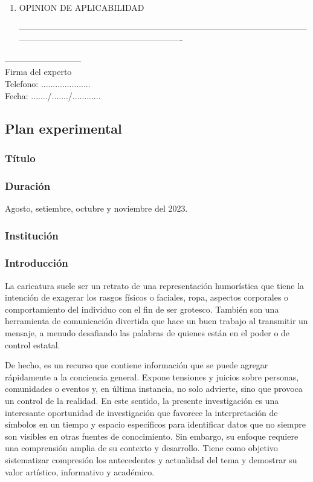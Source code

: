 \documentclass[12pt,a4paper]{article}
\begin{document}
\begin{enumerate}
	\item OPINION DE APLICABILIDAD

	      ----------------------------------------------------------------------------------------------------------------------------------------------------------------
\end{enumerate}

\begin{center}

	---------------------------\\
	Firma del experto\\
	Telefono: .....................\\
	Fecha: ......./......./............
\end{center}


\subsection{Plan experimental}
\subsubsection{Título} \titulo
\subsubsection{Duración} Agosto, setiembre, octubre y noviembre del 2023.
\subsubsection{Institución} \lugar
\subsubsection{Introducción}

La caricatura suele ser un retrato de una representación humorística que tiene la intención de exagerar los rasgos físicos o faciales, ropa, aspectos corporales o comportamiento del individuo con el fin de ser grotesco.  También son una herramienta de comunicación divertida que hace un buen trabajo al transmitir un mensaje, a menudo desafiando las palabras de quienes están en el poder o de control estatal. 

De hecho, es un recurso que contiene información que se puede agregar rápidamente a la conciencia general. Expone tensiones y juicios sobre personas, comunidades o eventos y, en última instancia, no solo advierte, sino que provoca un control de la realidad. En este sentido, la presente investigación es una interesante oportunidad de investigación que favorece la interpretación de símbolos en un tiempo y  espacio específicos para identificar datos que no siempre son visibles en otras fuentes de conocimiento. Sin embargo, su enfoque requiere una comprensión amplia de su contexto y desarrollo. Tiene como objetivo sistematizar compresión los antecedentes y actualidad del tema y demostrar su valor artístico, informativo y académico. 
\end{document}
